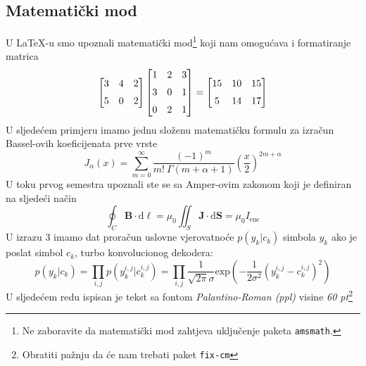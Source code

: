 \documentclass[a4paper, 10pt]{article}
\begin{document}
    \subsection{Matematički mod}
    U \LaTeX-u smo upoznali matematički mod\footnote{Ne zaboravite da matematički mod zahtjeva uključenje paketa \texttt{amsmath}.} koji nam omogućava i formatiranje matrica \newline{}
    \begin{displaymath}
        \left[
            \begin{matrix}
                \vspace{2mm}
                3 & 4 & 2 \\
                5 & 0 & 2
            \end{matrix}
        \right]
        \left[
            \begin{matrix}
                \vspace{2mm}
                1 & 2 & 3 \\
                \vspace{2mm}
                3 & 0 & 1 \\
                0 & 2 & 1
            \end{matrix}
        \right]
        =
        \left[
            \begin{matrix}
                \vspace{2mm}
                15 & 10 & 15 \\
                5 & 14 & 17
            \end{matrix}
        \right]
    \end{displaymath}
    U sljedećem primjeru imamo jednu složenu matematičku formulu za izračun Bassel-ovih koeficijenata prve vrste
    \begin{equation}
        J_{\alpha}(x) = \sum_{m=0}^{\infty}\frac{(-1)^m}{m!\ \Gamma(m + \alpha + 1)}\left(\frac{x}{2}\right)^{2m + \alpha}
    \end{equation}
    U toku prvog semestra upoznali ste se sa Amper-ovim zakonom koji je definiran na sljedeći način
    \begin{equation}
        \oint_C \textbf{B} \cdot \text{d}\boldsymbol{\ell} = \mu_0 \iint_S \textbf{J} \cdot \text{d}\textbf{S} = \mu_0I_{\text{enc}}
    \end{equation}
    U izrazu 3 imamo dat proračun uslovne vjerovatnoće $p(y_k|c_k)$ simbola $y_k$ ako je poslat simbol $c_k$, turbo konvolucionog dekodera:
    \begin{equation}
        p(y_k|c_k) = \prod_{i,j}p(y_k^{i,j}|c_k^{i,j}) = \prod_{i,j}\frac{1}{\sqrt{2\pi}\sigma}\text{exp}\left(-\frac{1}{2\sigma^2}\left(y_k^{i,j}-c_k^{i,j}\right)^2\right)
    \end{equation}
    U sljedećem redu ispisan je tekst sa fontom \textit{Palantino-Roman (ppl)} visine \textit{60 pt}\footnote{Obratiti pažnju da će nam trebati paket \texttt{fix-cm}} \newline{}
    \begin{center}
        {\selectfont\fontsize{60pt}{1pt}\selectfont{ONLY HUMAN}}
    \end{center}
\end{document}
